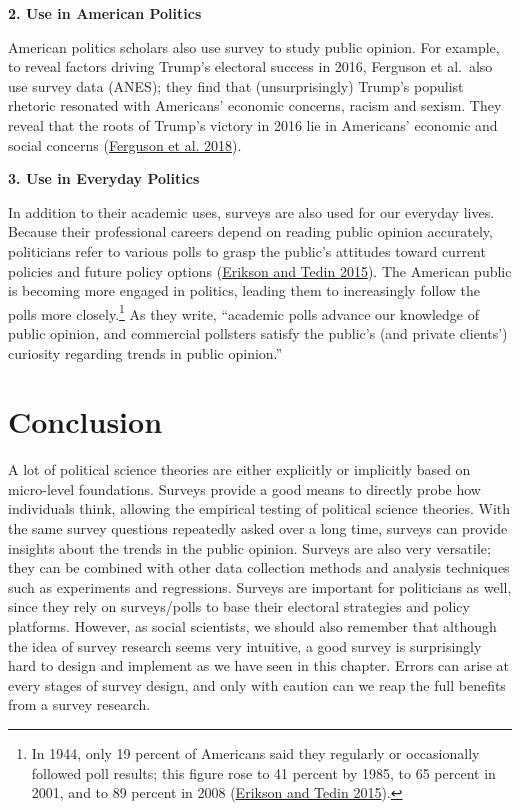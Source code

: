 \documentclass{book}
\begin{document}
\textbf{2. Use in American Politics}

American politics scholars also use survey to study public opinion. For
example, to reveal factors driving Trump's electoral success in 2016, Ferguson
et al.~also use survey data (ANES); they find that (unsurprisingly) Trump's
populist rhetoric resonated with Americans' economic concerns, racism and
sexism. They reveal that the roots of Trump's victory in 2016 lie in
Americans' economic and social concerns
(\protect\hyperlink{ref-ferguson2018economic}{Ferguson et al. 2018}).

\textbf{3. Use in Everyday Politics}

In addition to their academic uses, surveys are also used for our everyday
lives. Because their professional careers depend on reading public opinion
accurately, politicians refer to various polls to grasp the public's attitudes
toward current policies and future policy options
(\protect\hyperlink{ref-erikson2015american}{Erikson and Tedin 2015}). The
American public is becoming more engaged in politics, leading them to
increasingly follow the polls more closely.\footnote{In 1944, only 19 percent
  of Americans said they regularly or occasionally followed poll results; this
  figure rose to 41 percent by 1985, to 65 percent in 2001, and to 89 percent
  in 2008 (\protect\hyperlink{ref-erikson2015american}{Erikson and Tedin
  2015}).} As they write, ``academic polls advance our knowledge of public
opinion, and commercial pollsters satisfy the public's (and private clients')
curiosity regarding trends in public opinion.''

\hypertarget{conclusion-4}{%
\section{Conclusion}\label{conclusion-4}}

A lot of political science theories are either explicitly or implicitly based
on micro-level foundations. Surveys provide a good means to directly probe how
individuals think, allowing the empirical testing of political science
theories. With the same survey questions repeatedly asked over a long time,
surveys can provide insights about the trends in the public opinion. Surveys
are also very versatile; they can be combined with other data collection
methods and analysis techniques such as experiments and regressions. Surveys
are important for politicians as well, since they rely on surveys/polls to
base their electoral strategies and policy platforms. However, as social
scientists, we should also remember that although the idea of survey research
seems very intuitive, a good survey is surprisingly hard to design and
implement as we have seen in this chapter. Errors can arise at every stages of
survey design, and only with caution can we reap the full benefits from a
survey research.
\end{document}
